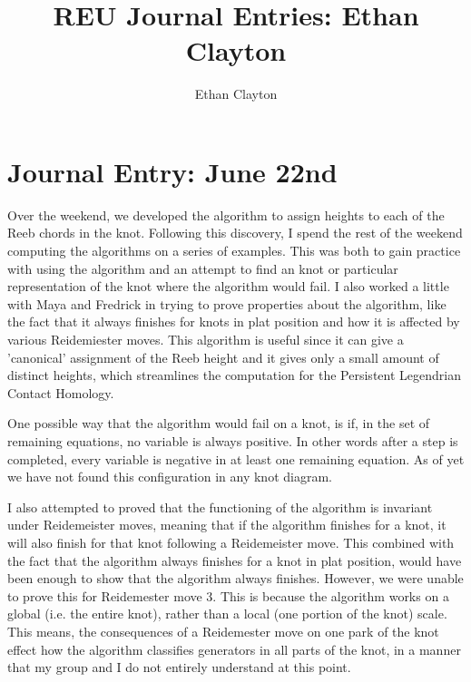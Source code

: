 \documentclass[11pt,oneside]{amsart}
\begin{document}
\author{Ethan Clayton}

\address{University of Illinois, Urbana-Champaign}

\title{REU Journal Entries: Ethan Clayton}

\maketitle

\tableofcontents
\newpage

\section{Journal Entry: June 22nd}

Over the weekend, we developed the algorithm to assign heights to each of the Reeb chords in the knot. Following this discovery, I spend the rest of the weekend computing the algorithms on a series of examples. This was both to gain practice with using the algorithm and an attempt to find an knot or particular representation of the knot where the algorithm would fail. I also worked a little with Maya and Fredrick in trying to prove properties about the algorithm, like the fact that it always finishes for knots in plat position and how it is affected by various Reidemiester moves. This algorithm is useful since it can give a 'canonical' assignment of the Reeb height and it gives only a small amount of distinct heights, which streamlines the computation for the Persistent Legendrian Contact Homology.
\newline

One possible way that the algorithm would fail on a knot, is if, in the set of remaining equations, no variable is always positive. In other words after a step is completed, every variable is negative in at least one remaining equation. As of yet we have not found this configuration in any knot diagram.
\newline

I also attempted to proved that the functioning of the algorithm is invariant under Reidemeister moves, meaning that if the algorithm finishes for a knot, it will also finish for that knot following a Reidemeister move. This combined with the fact that the algorithm always finishes for a knot in plat position, would have been enough to show that the algorithm always finishes. However, we were unable to prove this for Reidemester move 3. This is because the algorithm works on a global (i.e. the entire knot), rather than a local (one portion of the knot) scale. This means, the consequences of a Reidemester move on one park of the knot effect how the algorithm classifies generators in all parts of the knot, in a manner that my group and I do not entirely understand at this point. 
\newline
\end{document}
